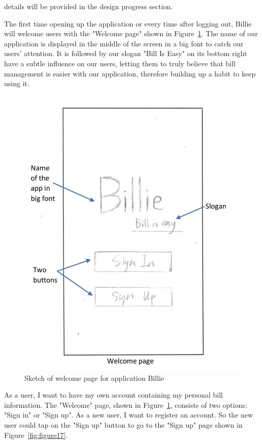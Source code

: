 \documentclass{sigchi}
\begin{document}
details will be provided in the design progress section.



The first time opening up the application or every time after logging out, Billie will welcome users with the "Welcome page" shown in Figure~\ref{fig:figure16}. The name of our application is displayed in the middle of the screen in a big font to catch our users' attention. It is followed by our slogan "Bill Is Easy" on its bottom right have a subtle influence on our users, letting them to truly believe that bill management is easier with our application, therefore building up a habit to keep using it.


\begin{figure}[h!]
\centering
  \includegraphics[width=0.6\columnwidth]{1-welcome-page.jpg}
  \caption{Sketch of welcome page for application Billie}
  \label{fig:figure16}
\end{figure}
As a user, I want to have my own account containing my personal bill information. The "Welcome" page, shown in Figure~\ref{fig:figure16}, consists of two options: "Sign in" or "Sign up". As a new user, I want to register an account. So the new user could tap on the "Sign up" button to go to the "Sign up" page shown in Figure~\ref{fig:figure17}.
\end{document}
